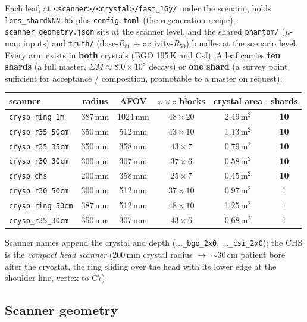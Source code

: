 \documentclass[11pt,a4paper]{article}
\begin{document}
Each leaf, at \texttt{<scanner>/<crystal>/fast\_1Gy/} under the scenario, holds
\texttt{lors\_shardNNN.h5} plus \texttt{config.toml} (the regeneration recipe);
\texttt{scanner\_geometry.json} sits at the scanner level, and the shared \texttt{phantom/}
($\mu$-map inputs) and \texttt{truth/} (dose-$R_{80}$ + activity-$R_{50}$) bundles at the
scenario level. Every arm exists in \textbf{both} crystals (BGO 195\,K and CsI). A leaf carries
\textbf{ten shards} (a full master, $\Sigma M \approx 8.0\times10^8$ decays) or \textbf{one
shard} (a survey point sufficient for acceptance / composition, promotable to a master on
request):

\begin{center}
\small\setlength{\tabcolsep}{5pt}
\begin{tabular}{lccccc}
\toprule
scanner & radius & AFOV & $\varphi\times z$ blocks & crystal area & shards \\
\midrule
\texttt{crysp\_ring\_1m}   & 387\,mm & 1024\,mm & $48\times20$ & 2.49\,m$^2$ & \textbf{10} \\
\texttt{crysp\_r35\_50cm}  & 350\,mm & 512\,mm  & $43\times10$ & 1.13\,m$^2$ & \textbf{10} \\
\texttt{crysp\_r35\_35cm}  & 350\,mm & 358\,mm  & $43\times7$  & 0.79\,m$^2$ & \textbf{10} \\
\texttt{crysp\_r30\_30cm}  & 300\,mm & 307\,mm  & $37\times6$  & 0.58\,m$^2$ & \textbf{10} \\
\texttt{crysp\_chs}        & 200\,mm & 358\,mm  & $25\times7$  & 0.45\,m$^2$ & \textbf{10} \\
\texttt{crysp\_r30\_50cm}  & 300\,mm & 512\,mm  & $37\times10$ & 0.97\,m$^2$ & 1 \\
\texttt{crysp\_ring\_50cm} & 387\,mm & 512\,mm  & $48\times10$ & 1.25\,m$^2$ & 1 \\
\texttt{crysp\_r35\_30cm}  & 350\,mm & 307\,mm  & $43\times6$  & 0.68\,m$^2$ & 1 \\
\bottomrule
\end{tabular}
\end{center}

Scanner names append the crystal and depth ($\ldots$\texttt{\_bgo\_2x0}, $\ldots$\texttt{\_csi\_2x0});
the CHS is the \emph{compact head scanner} (200\,mm crystal radius $\to$ ${\sim}30$\,cm patient
bore after the cryostat, the ring sliding over the head with its lower edge at the shoulder
line, vertex-to-C7).

\subsection*{Scanner geometry}
\end{document}
